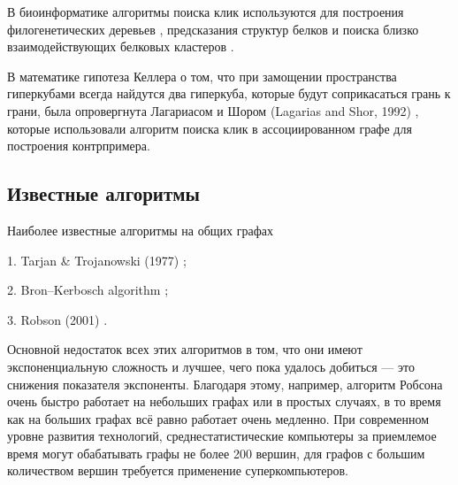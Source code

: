     В биоинформатике алгоритмы поиска клик используются для построения
    филогенетических деревьев \cite{day1986computational},
    предсказания структур белков \cite{samudrala1998graph} и поиска близко
    взаимодействующих белковых кластеров \cite{spirin2003protein}.

    В математике гипотеза Келлера о том, что при замощении пространства
    гиперкубами всегда найдутся два гиперкуба, которые будут соприкасаться грань
    к грани, была опровергнута Лагариасом и Шором (Lagarias and Shor, 1992) \cite{lagarias1992keller}, 
    которые использовали алгоритм поиска клик в ассоциированном графе для построения 
    контрпримера.

  \subsection{Известные алгоритмы}
    Наиболее известные алгоритмы на общих графах
      
      1. Tarjan \& Trojanowski (1977) \cite{tarjan1977finding};
      
      2. Bron–Kerbosch algorithm \cite{bron1973algorithm};
      
      3. Robson (2001) \cite{robson2001finding}.
    
    Основной недостаток всех этих алгоритмов в том, что они имеют экспоненциальную
    сложность и лучшее, чего пока удалось добиться --- это снижения показателя экспоненты.
    Благодаря этому, например, алгоритм Робсона \cite{robson2001finding} очень быстро
    работает на небольших графах или в простых случаях, в то время как на больших
    графах всё равно работает очень медленно.
    При современном уровне развития технологий, среднестатистические компьютеры за
    приемлемое время могут обабатывать графы не более 200 вершин, для графов с большим
    количеством вершин требуется применение суперкомпьютеров.





